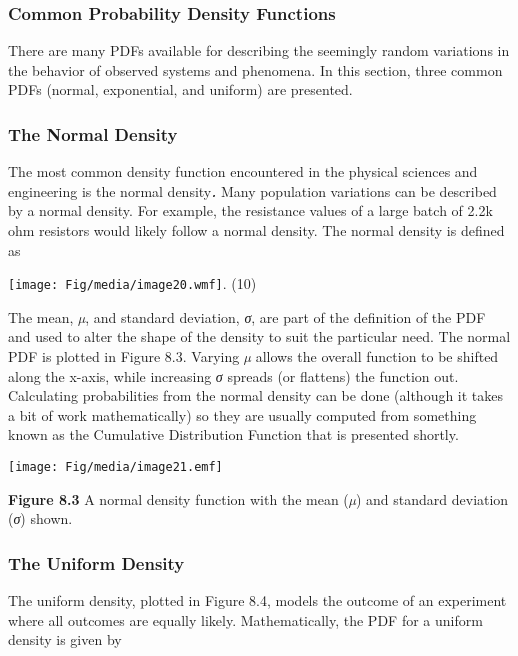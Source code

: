 \subsubsection{Common Probability Density
Functions}\label{common-probability-density-functions}

There are many PDFs available for describing the seemingly random
variations in the behavior of observed systems and phenomena. In this
section, three common PDFs (normal, exponential, and uniform) are
presented.

\subsubsection*{The Normal Density}\label{the-normal-density}

The most common density function encountered in the physical sciences
and engineering is the normal density\emph{\textbf{.}} Many population
variations can be described by a normal density. For example, the
resistance values of a large batch of 2.2k ohm resistors would likely
follow a normal density. The normal density is defined as

\texttt{[image: Fig/media/image20.wmf]}. (10)

The mean, \emph{µ}, and standard deviation, \emph{σ}, are part of the
definition of the PDF and used to alter the shape of the density to suit
the particular need. The normal PDF is plotted in Figure 8.3. Varying
\emph{µ} allows the overall function to be shifted along the x-axis,
while increasing \emph{σ} spreads (or flattens) the function out.
Calculating probabilities from the normal density can be done (although
it takes a bit of work mathematically) so they are usually computed from
something known as the Cumulative Distribution Function that is
presented shortly.

\texttt{[image: Fig/media/image21.emf]}

\textbf{Figure 8.3} A normal density function with the mean (\emph{µ})
and standard deviation (\emph{σ}) shown.

\subsubsection*{The Uniform Density}\label{the-uniform-density}

The uniform density, plotted in Figure 8.4, models the outcome of an
experiment where all outcomes are equally likely. Mathematically, the
PDF for a uniform density is given by

